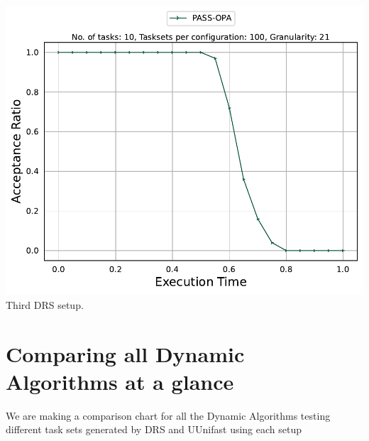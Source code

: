 \documentclass[]{article}
\begin{document}
\begin{minipage}[t]{0.48\linewidth}
		\includegraphics[width=\linewidth]{PASS-OPA_3rd[21][0.01-0.1][10].pdf}
		Third DRS setup.
		\vspace{0.3cm}
	\end{minipage}

	\clearpage
	\section{Comparing all Dynamic Algorithms at a glance}
{
\raggedleft We are making a comparison chart for all the Dynamic Algorithms testing different task sets generated by DRS and UUnifast using each setup \newline
}
\end{document}
